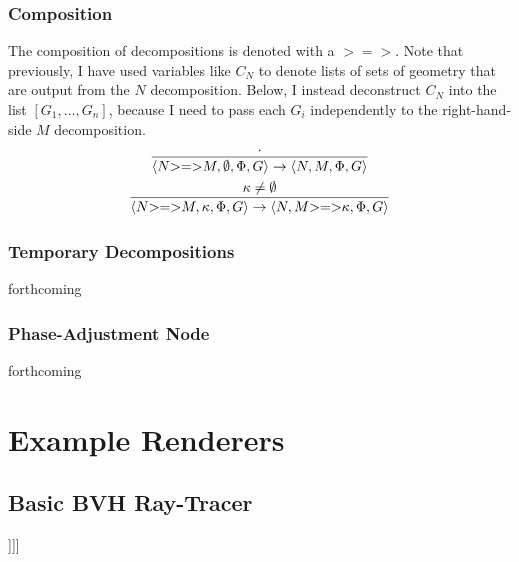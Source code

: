 \documentclass{article}
\newcommand {\oneS}{\mathtt{1S}}
\newcommand {\comp}{\mathtt{>=>}}
\begin{document}
\subsubsection{Composition}
The composition of decompositions is denoted with a $\comp$. Note that previously, I have used variables like $C_N$ to denote lists of sets of geometry that are output from the $N$ decomposition.  Below, I instead deconstruct $C_N$ into the list $[G_1,\ldots,G_n]$, because I need to pass each $G_i$ independently to the right-hand-side $M$ decomposition.
\begin{gather}
\infer{\langle N \comp M, \emptyset, \Phi, G \rangle \to \langle  N, M, \Phi, G \rangle}{\cdot}
\\
\infer{\langle N \comp M, \kappa, \Phi, G \rangle \to \langle  N, M \comp \kappa, \Phi, G \rangle}{ \kappa \not = \emptyset}
\end{gather}

\subsubsection{Temporary Decompositions}

forthcoming

\subsubsection{Phase-Adjustment Node}

forthcoming

\section{Example Renderers}

\subsection{Basic BVH Ray-Tracer}

\begin{center}
\Tree [. [.$\comp$ $\oneS$ [.VP [.V is ] [.NP fun ]]]]
\end{center}
\end{document}
